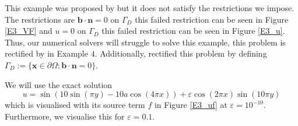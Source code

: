 \documentclass[12pt]{ociamthesis}
\begin{document}
 This example was proposed by \cite{DN} but it does not satisfy the restrictions we impose. The restrictions are $\mathbf{b} \cdot \mathbf{n} = 0$ on $\Gamma_D$ this failed restriction can be seen in Figure \ref{E3_VF} and $u = 0$ on $\Gamma_D$ this failed restriction can be seen in Figure \ref{E3_u}. Thus, our numerical solvers will struggle to solve this example, this problem is rectified by in Example $4$. Additionally, \cite{DN} rectified this problem by defining $\Gamma_D := \{\mathbf{x} \in \partial \Omega :  \mathbf{b} \cdot \mathbf{n} = 0\}$.

We will use the exact solution
\begin{equation}
u = \sin(10\sin(\pi y)-10a\cos(4 \pi x)) + \varepsilon \cos(2 \pi x)\sin(10 \pi y)
\end{equation}
which is visualised with its source term $f$ in Figure \ref{E3_uf} at $\varepsilon = 10^{-10}$. Furthermore, we visualise this for $\varepsilon = 0.1$.
\end{document}
